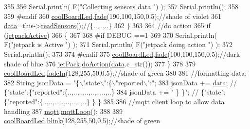 \begin{DoxyCode}
355 
356         Serial.println( F(\textcolor{stringliteral}{"Collecting sensors data "}) );
357         Serial.println();
358     
359 \textcolor{preprocessor}{    #endif}
360         \hyperlink{classCoolBoard_a1b1d3c684a5baa56b08486e192fd8e97}{coolBoardLed}.\hyperlink{classCoolBoardLed_af1cacbaa88db8bcf6042c1083ba41155}{fade}(190,100,150,0.5);\textcolor{comment}{//shade of violet        }
361         \hyperlink{classCoolBoard_a427fb753dd8575bdf821c70a5c63d695}{data}=this->\hyperlink{classCoolBoard_ad03abdce2e65f520bbf2cff0f2d083cf}{readSensors}();\textcolor{comment}{//\{..,..,..\}}
362     \}
363     
364     \textcolor{comment}{//do action}
365     \textcolor{keywordflow}{if} (\hyperlink{classCoolBoard_a9be03a913d26e558328935ca3b59a75e}{jetpackActive})
366     \{
367     
368 \textcolor{preprocessor}{    #if DEBUG ==1}
369 
370         Serial.println( F(\textcolor{stringliteral}{"jetpack is Active "}) );
371         Serial.println( F(\textcolor{stringliteral}{"jetpack doing action "}) );
372         Serial.println();
373 
374 \textcolor{preprocessor}{    #endif}
375         \hyperlink{classCoolBoard_a1b1d3c684a5baa56b08486e192fd8e97}{coolBoardLed}.\hyperlink{classCoolBoardLed_af1cacbaa88db8bcf6042c1083ba41155}{fade}(100,100,150,0.5);\textcolor{comment}{//dark shade of blue     }
376         \hyperlink{classCoolBoard_a30b1357881b01ccbec676856a91e48e9}{jetPack}.\hyperlink{classJetpack_a9e703197093094b963f9ad57817495b8}{doAction}(\hyperlink{classCoolBoard_a427fb753dd8575bdf821c70a5c63d695}{data}.c\_str());
377     \}
378     
379     \hyperlink{classCoolBoard_a1b1d3c684a5baa56b08486e192fd8e97}{coolBoardLed}.\hyperlink{classCoolBoardLed_ab778f5e7bed0ab74e3906d82110493c3}{fadeIn}(128,255,50,0.5);\textcolor{comment}{//shade of green}
380 
381     \textcolor{comment}{//formatting data:}
382     String jsonData = \textcolor{stringliteral}{"\{\(\backslash\)"state\(\backslash\)":\{\(\backslash\)"reported\(\backslash\)":"};
383     jsonData += \hyperlink{classCoolBoard_a427fb753dd8575bdf821c70a5c63d695}{data}; \textcolor{comment}{// \{"state":\{"reported":\{..,..,..,..,..,..,..,..\}}
384     jsonData += \textcolor{stringliteral}{" \} \}"}; \textcolor{comment}{// \{"state":\{"reported":\{..,..,..,..,..,..,..,..\}  \} \}}
385     
386     \textcolor{comment}{//mqtt client loop to allow data handling}
387     \hyperlink{classCoolBoard_a2399f44d7c23c1149a335cb3b46d90f1}{mqtt}.\hyperlink{classCoolMQTT_aa5eaae967b562b62cbcf2b8d81f6e5d5}{mqttLoop}();
388 
389     \hyperlink{classCoolBoard_a1b1d3c684a5baa56b08486e192fd8e97}{coolBoardLed}.\hyperlink{classCoolBoardLed_a96e1ea13003eee34c9dbcef340404426}{blink}(128,255,50,0.5);\textcolor{comment}{//shade of green    }

\end{DoxyCode}
